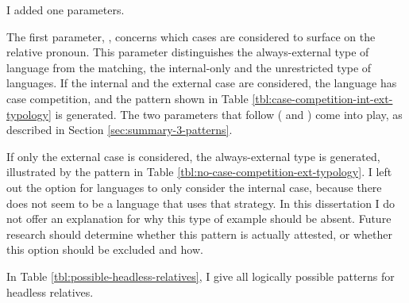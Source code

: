 I added one parameters.


The first parameter, , concerns which cases are considered to surface on the relative pronoun. This parameter distinguishes the always-external type of language from the matching, the internal-only and the unrestricted type of languages.
If the internal and the external case are considered, the language has case competition, and the pattern shown in Table \ref{tbl:case-competition-int-ext-typology} is generated. The two parameters that follow ( and ) come into play, as described in Section \ref{sec:summary-3-patterns}.

If only the external case is considered, the always-external type is generated, illustrated by the pattern in Table \ref{tbl:no-case-competition-ext-typology}.
I left out the option for languages to only consider the internal case, because there does not seem to be a language that uses that strategy.
In this dissertation I do not offer an explanation for why this type of example should be absent. Future research should determine whether this pattern is actually attested, or whether this option should be excluded and how.

In Table \ref{tbl:possible-headless-relatives}, I give all logically possible patterns for headless relatives.

